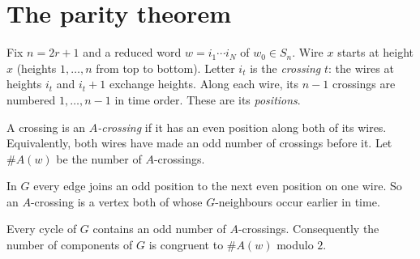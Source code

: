 \section{The parity theorem}\label{sec:parity}

Fix $n=2r+1$ and a reduced word $w=i_1\cdots i_N$ of $w_0\in S_n$. Wire $x$ starts at height $x$
(heights $1,\dots,n$ from top to bottom). Letter $i_t$ is the \emph{crossing} $t$: the wires at heights
$i_t$ and $i_t+1$ exchange heights. Along each wire, its $n-1$ crossings are numbered $1,\dots,n-1$ in
time order. These are its \emph{positions}.

\begin{definition}
A crossing is an \emph{$A$-crossing} if it has an even position along both of its wires.
Equivalently, both wires have made an odd number of crossings before it. Let $\#A(w)$ be the number
of $A$-crossings.
\end{definition}

In $G$ every edge joins an odd position to the next even position on one wire. So an $A$-crossing is
a vertex both of whose $G$-neighbours occur earlier in time.

\begin{lemma}\label{lem:percycle}
Every cycle of $G$ contains an odd number of $A$-crossings. Consequently the number of
components of $G$ is congruent to $\#A(w)$ modulo $2$.
\end{lemma}

